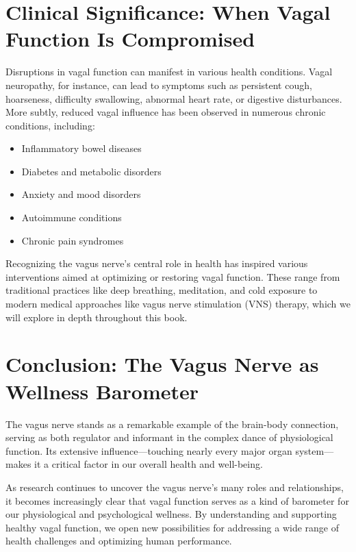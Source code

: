 \documentclass[
  Letterpaper,
]{scrbook}
\providecommand{\tightlist}{%
  \setlength{\itemsep}{0pt}\setlength{\parskip}{0pt}}\usepackage{longtable,booktabs,array}
\begin{document}
\section{Clinical Significance: When Vagal Function Is
Compromised}\label{clinical-significance-when-vagal-function-is-compromised}

Disruptions in vagal function can manifest in various health conditions.
Vagal neuropathy, for instance, can lead to symptoms such as persistent
cough, hoarseness, difficulty swallowing, abnormal heart rate, or
digestive disturbances. More subtly, reduced vagal influence has been
observed in numerous chronic conditions, including:

\begin{itemize}
\tightlist
\item
  Inflammatory bowel diseases
\item
  Diabetes and metabolic disorders
\item
  Anxiety and mood disorders
\item
  Autoimmune conditions
\item
  Chronic pain syndromes
\end{itemize}

Recognizing the vagus nerve's central role in health has inspired
various interventions aimed at optimizing or restoring vagal function.
These range from traditional practices like deep breathing, meditation,
and cold exposure to modern medical approaches like vagus nerve
stimulation (VNS) therapy, which we will explore in depth throughout
this book.

\section{Conclusion: The Vagus Nerve as Wellness
Barometer}\label{conclusion-the-vagus-nerve-as-wellness-barometer}

The vagus nerve stands as a remarkable example of the brain-body
connection, serving as both regulator and informant in the complex dance
of physiological function. Its extensive influence---touching nearly
every major organ system---makes it a critical factor in our overall
health and well-being.

As research continues to uncover the vagus nerve's many roles and
relationships, it becomes increasingly clear that vagal function serves
as a kind of barometer for our physiological and psychological wellness.
By understanding and supporting healthy vagal function, we open new
possibilities for addressing a wide range of health challenges and
optimizing human performance.
\end{document}
